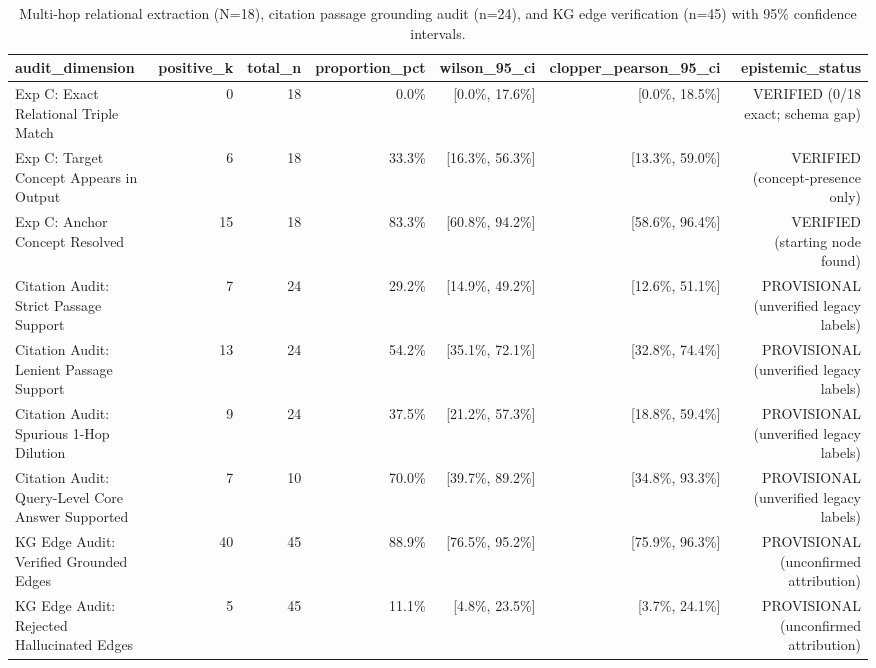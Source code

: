 \begin{table}[t]
\centering
\small
\caption{Multi-hop relational extraction (N=18), citation passage grounding audit (n=24), and KG edge verification (n=45) with 95\% confidence intervals.}
\label{tab:t6_grounding_audit}
\begin{tabular}{lrrrrrr}
\toprule
\textbf{audit\_dimension} & \textbf{positive\_k} & \textbf{total\_n} & \textbf{proportion\_pct} & \textbf{wilson\_95\_ci} & \textbf{clopper\_pearson\_95\_ci} & \textbf{epistemic\_status} \\
\midrule
Exp C: Exact Relational Triple Match & 0 & 18 & 0.0\% & [0.0\%, 17.6\%] & [0.0\%, 18.5\%] & VERIFIED (0/18 exact; schema gap) \\
Exp C: Target Concept Appears in Output & 6 & 18 & 33.3\% & [16.3\%, 56.3\%] & [13.3\%, 59.0\%] & VERIFIED (concept-presence only) \\
Exp C: Anchor Concept Resolved & 15 & 18 & 83.3\% & [60.8\%, 94.2\%] & [58.6\%, 96.4\%] & VERIFIED (starting node found) \\
Citation Audit: Strict Passage Support & 7 & 24 & 29.2\% & [14.9\%, 49.2\%] & [12.6\%, 51.1\%] & PROVISIONAL (unverified legacy labels) \\
Citation Audit: Lenient Passage Support & 13 & 24 & 54.2\% & [35.1\%, 72.1\%] & [32.8\%, 74.4\%] & PROVISIONAL (unverified legacy labels) \\
Citation Audit: Spurious 1-Hop Dilution & 9 & 24 & 37.5\% & [21.2\%, 57.3\%] & [18.8\%, 59.4\%] & PROVISIONAL (unverified legacy labels) \\
Citation Audit: Query-Level Core Answer Supported & 7 & 10 & 70.0\% & [39.7\%, 89.2\%] & [34.8\%, 93.3\%] & PROVISIONAL (unverified legacy labels) \\
KG Edge Audit: Verified Grounded Edges & 40 & 45 & 88.9\% & [76.5\%, 95.2\%] & [75.9\%, 96.3\%] & PROVISIONAL (unconfirmed attribution) \\
KG Edge Audit: Rejected Hallucinated Edges & 5 & 45 & 11.1\% & [4.8\%, 23.5\%] & [3.7\%, 24.1\%] & PROVISIONAL (unconfirmed attribution) \\
\bottomrule
\end{tabular}
\end{table}

